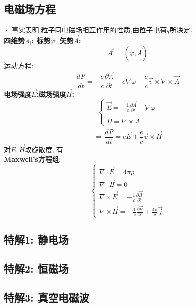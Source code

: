 \documentclass{article}
\begin{document}
\subsection{电磁场方程}
· 事实表明,粒子同电磁场相互作用的性质,由粒子电荷$q$所决定.\\
\textbf{四维势$A_{i}$: \quad 标势$\varphi$: \quad 矢势$\vec A$:}
$$A^{i}=(\varphi,\vec A)$$
运动方程:
$$\frac{d\vec P}{dt} = - \frac{e}{c} \frac{\partial\vec A}{\partial t} - e \nabla \varphi + \frac{e}{c} \vec v \times \nabla \times \vec A$$
\textbf{电场强度$\vec E$:\quad 磁场强度$\vec H$:}
\begin{displaymath}
    \left\{ \begin{array}{ll}
    \vec E = -\frac{1}{c} \frac{\partial \vec A}{\partial t} - \nabla \varphi\\
    \vec H = \nabla \times \vec A
    \end{array} \right.
\end{displaymath}
$$\Rightarrow \frac{d\vec P}{dt} = e \vec E + \frac{e}{c} \vec v \times \vec H$$
对$\vec E,\vec H$取旋散度, 有\\
\textbf{Maxwell's方程组}:
\begin{displaymath}
    \left\{ \begin{array}{ll}
    \nabla \cdot \vec E = 4\pi\rho\\
    \nabla \cdot \vec H = 0\\
    \nabla \times \vec E = - \frac{1}{c} \frac{\partial \vec H}{\partial t}\\
    \nabla \times \vec H = - \frac{1}{c} \frac{\partial \vec E}{\partial t} + \frac{4\pi}{c}\vec j
    \end{array} \right.
\end{displaymath}


\subsection{特解1: 静电场}


\subsection{特解2: 恒磁场}


\subsection{特解3: 真空电磁波}




\section{}
\end{document}
